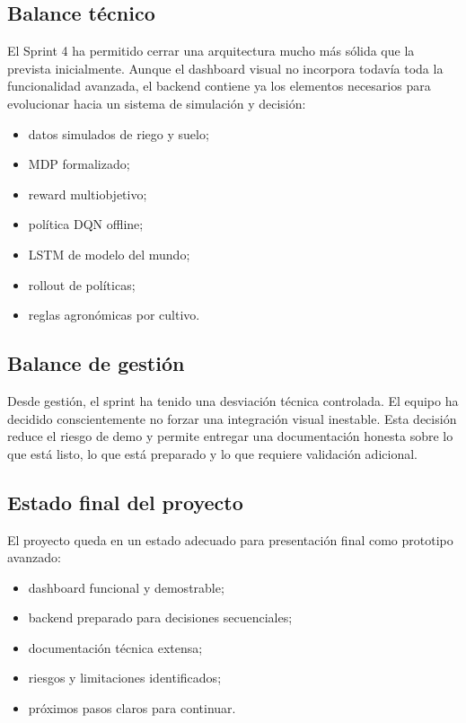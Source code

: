 \documentclass[11pt,a4paper]{article}
\begin{document}
\subsection{Balance técnico}

El Sprint 4 ha permitido cerrar una arquitectura mucho más sólida que la prevista inicialmente. Aunque el dashboard visual no incorpora todavía toda la funcionalidad avanzada, el backend contiene ya los elementos necesarios para evolucionar hacia un sistema de simulación y decisión:

\begin{itemize}
    \item datos simulados de riego y suelo;
    \item MDP formalizado;
    \item reward multiobjetivo;
    \item política DQN offline;
    \item LSTM de modelo del mundo;
    \item rollout de políticas;
    \item reglas agronómicas por cultivo.
\end{itemize}

\subsection{Balance de gestión}

Desde gestión, el sprint ha tenido una desviación técnica controlada. El equipo ha decidido conscientemente no forzar una integración visual inestable. Esta decisión reduce el riesgo de demo y permite entregar una documentación honesta sobre lo que está listo, lo que está preparado y lo que requiere validación adicional.

\subsection{Estado final del proyecto}

El proyecto queda en un estado adecuado para presentación final como prototipo avanzado:

\begin{itemize}
    \item dashboard funcional y demostrable;
    \item backend preparado para decisiones secuenciales;
    \item documentación técnica extensa;
    \item riesgos y limitaciones identificados;
    \item próximos pasos claros para continuar.
\end{itemize}
\end{document}
